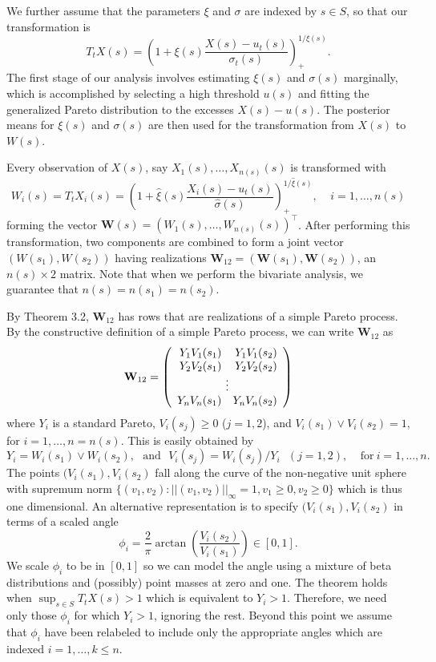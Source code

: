 \documentclass[12pt]{article}
\newcommand{\m}[1]{\mathbf{\bm{#1}}}
\begin{document}
We further assume that the parameters $\xi$ and $\sigma$ are indexed by $s\in S$, so that our transformation is
\[ T_t X(s) = \left(1 + \xi(s) \frac{X(s) - u_t(s)}{\sigma_t(s)}\right)_+^{1/\xi(s)}. \]
The first stage of our analysis involves estimating $\xi(s)$ and $\sigma(s)$ marginally, which is accomplished by selecting a high threshold $u(s)$ and fitting the generalized Pareto distribution to the excesses $X(s)-u(s)$. The posterior means for $\xi(s)$ and $\sigma(s)$ are then used for the transformation from $X(s)$ to $W(s)$.
\bigskip

Every observation of $X(s)$, say $X_1(s),\ldots,X_{n(s)}(s)$ is transformed with
\[ W_i(s) = T_t X_i(s) = \left(1 + \hat{\xi}(s) \frac{X_i(s) - u_t(s)}{\hat{\sigma}(s)}\right)_+^{1/\hat{\xi}(s)},~~~~~i=1,\ldots,n(s) \]
forming the vector $\m{W}(s)=(W_1(s),\ldots,W_{n(s)}(s))^\top$. After performing this transformation, two components are combined to form a joint vector $(W(s_1), W(s_2))$ having realizations $\m{W}_{12}=(\m{W}(s_1), \m{W}(s_2))$, an $n(s)\times 2$ matrix. Note that when we perform the bivariate analysis, we guarantee that $n(s)=n(s_1)=n(s_2)$.
\bigskip

By Theorem 3.2, $\m{W}_{12}$ has rows that are realizations of a simple Pareto process. By the constructive definition of a simple Pareto process, we can write $\m{W}_{12}$ as
\[ \m{W}_{12} = \left(\begin{array}{rr} Y_1V_1(s_1) & Y_1V_1(s_2) \\ Y_2V_2(s_1) & Y_2V_2(s_2) \\ \multicolumn{2}{c}{\vdots} \\ Y_nV_n(s_1) & Y_nV_n(s_2) \end{array}\right) \]
where $Y_i$ is a standard Pareto, $V_i(s_j)\geq 0$ ($j=1,2$), and $V_i(s_1) \vee V_i(s_2) = 1$, for $i=1,\ldots,n=n(s)$. This is easily obtained by
\[ Y_i = W_i(s_1) \vee W_i(s_2),~~~\mathrm{and}~~~ V_i(s_j) = W_i(s_j) / Y_i ~~~ (j=1,2),~~~~~\mathrm{for~}i=1,\ldots,n. \]
The points $(V_i(s_1), V_i(s_2)$ fall along the curve of the non-negative unit sphere with supremum norm $\{(v_1, v_2):||(v_1,v_2)||_\infty=1, v_1\geq0,v_2\geq0\}$ which is thus one dimensional. An alternative representation is to specify $(V_i(s_1), V_i(s_2)$ in terms of a scaled angle
\[ \phi_i = \frac{2}{\pi}\arctan\left(\frac{V_i(s_2)}{V_i(s_1)}\right)\in[0,1]. \]
We scale $\phi_i$ to be in $[0,1]$ so we can model the angle using a mixture of beta distributions and (possibly) point masses at zero and one. The theorem holds when $\sup_{s\in S}T_t X(s) > 1$ which is equivalent to $Y_i > 1$. Therefore, we need only those $\phi_i$ for which $Y_i>1$, ignoring the rest. Beyond this point we assume that $\phi_i$ have been relabeled to include only the appropriate angles which are indexed $i=1,\ldots,k\leq n$.
\end{document}
